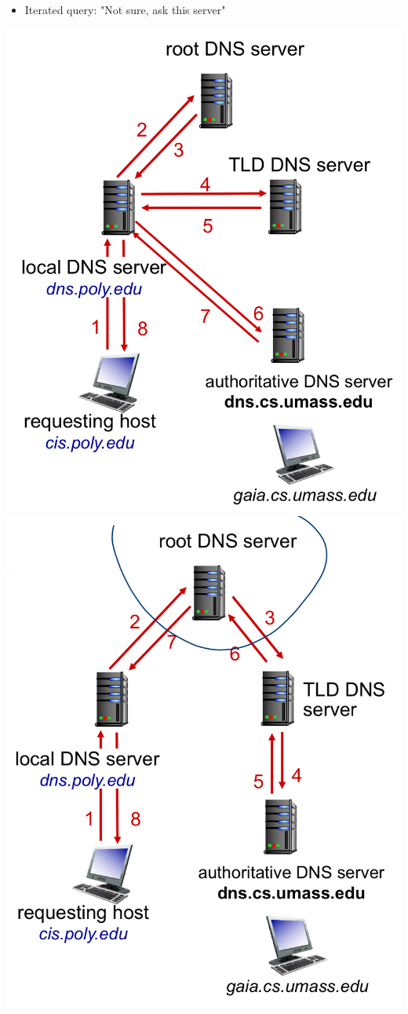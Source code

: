 \documentclass{article}
\begin{document}
\begin{multicols*}{3}
\begin{itemize}
	\item Iterated query: "Not sure, ask this server"    
\end{itemize}
\includegraphics[scale=0.13]{dns-iterative-query}
\includegraphics[scale=0.15]{dns-recursive-query}

\end{multicols*}
\end{document}
